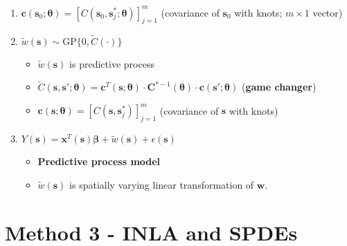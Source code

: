 \documentclass{article}
\begin{document}
\begin{enumerate}

            \item $\pmb{c}(\pmb{s}_{0};\pmb{\theta}) = \left[C(\pmb{s}_{0}, \pmb{s}_{j}^{*}; \pmb{\theta})\right]_{j = 1}^{m}$ (covariance of $\pmb{s}_{0}$ with knots; $m \times 1$ vector)
\item $\tilde{w}(\pmb{s}) \sim \text{GP}\{0, \tilde{C}(\cdot)\}$
              \begin{itemize}
              \item $\tilde{w}(\pmb{s})$ is predictive process
              \item $\tilde{C}(\pmb{s}, \pmb{s}'; \pmb{\theta}) = \pmb{c}^{T}(\pmb{s};\pmb{\theta}) \cdot \pmb{C}^{*-1}(\pmb{\theta}) \cdot \pmb{c}(\pmb{s}';\pmb{\theta})$ ({\bf game changer})
              \item $\pmb{c}(\pmb{s};\pmb{\theta}) = \left[C(\pmb{s}, \pmb{s}_{j}^{*})\right]_{j = 1}^{m}$ (covariance of $\pmb{s}$ with knots)
              
              \end{itemize}
\item $Y(\pmb{s}) = \pmb{x}^{T}(\pmb{s})\pmb{\beta} + \tilde{w}(\pmb{s}) + \epsilon(\pmb{s})$
              \begin{itemize}
              \item {\bf Predictive process model}
              \item $\tilde{w}(\pmb{s})$ is spatially varying linear transformation of $\pmb{w}$.
              \end{itemize}
\end{enumerate}


\section{Method 3 - INLA and SPDEs} %

\appendix
\end{document}
